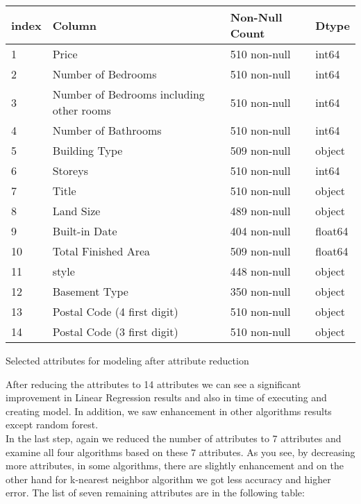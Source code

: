 \documentclass{article}
\begin{document}
\begin{center}
    \begin{tabular}{ | m{2em} | m{5cm}| m{2.5cm} | m{2cm} |} 
        \hline
        index &  Column    &          Non-Null Count & Dtype   \\ 
        \hline
        1 &  Price   &            510 non-null &   int64  \\ 
        2  & Number of Bedrooms     &       510 non-null  &  int64   \\ 
        3 & Number of Bedrooms including other rooms &      510 non-null &   int64  \\
         4  & Number of Bathrooms      &     510 non-null  &  int64  \\
         5  & Building Type     &   509 non-null &   object \\
         6  & Storeys           &  510 non-null  &  int64  \\
         7  & Title          &     510 non-null &   object \\
         8  & Land Size        &    489 non-null  &  object \\
         9 & Built-in Date         &   404 non-null   & float64\\
         10 & Total Finished Area  & 509 non-null  &  float64\\
         11 & style         &      448 non-null  &  object \\
         12 & Basement Type      &  350 non-null &   object \\
         13 & Postal Code (4 first digit) &  510 non-null  &  object \\
         14 & Postal Code (3 first digit) &  510 non-null   & object \\
         \hline
    \end{tabular} 
    \caption{Selected attributes for modeling after attribute reduction}
\end{center}
After reducing the attributes to 14 attributes we can see a significant improvement in Linear Regression results and also in time of executing and creating model. 
In addition, we saw enhancement in other algorithms results except random forest.\\ 
In the last step, again we reduced the number of attributes to 7 attributes and examine all four algorithms based on these 7 attributes. As you see, by decreasing more attributes, in some algorithms, there are slightly enhancement and on the other hand for k-nearest neighbor algorithm we got less accuracy and higher error. The list of seven remaining attributes are in the following table:\\
\end{document}
